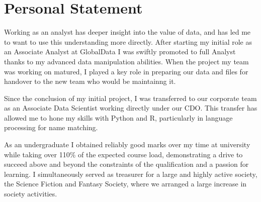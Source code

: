\documentclass[print, oneside]{friggeri-cv} %
\begin{document}
\section{Personal Statement}
\begin{entrylist}
\entrybasic{}{}{}{}
{

\quad Working as an analyst has deeper insight into the value of data, and has led me to want to use this understanding more directly.
After starting my initial role as an Associate Analyst at GlobalData I was swiftly promoted to full Analyst thanks to my advanced data manipulation abilities.
When the project my team was working on matured, I played a key role in preparing our data and files for handover to the new team who would be maintainng it.

\quad Since the conclusion of my initial project, I was transferred to our corporate team as an Associate Data Scientist working directly under our CDO.
This transfer has allowed me to hone my skills with Python and R, particularly in language processing for name matching.

\quad As an undergraduate I obtained reliably good marks over my time at university while taking over 110\% of the expected course load, demonstrating a drive to succeed above and beyond the constraints of the qualification and a passion for learning.
I simultaneously served as treasurer for a large and highly active society, the Science Fiction and Fantasy Society, where we arranged a large increase in society activities.


}
\end{entrylist}
\end{document}
